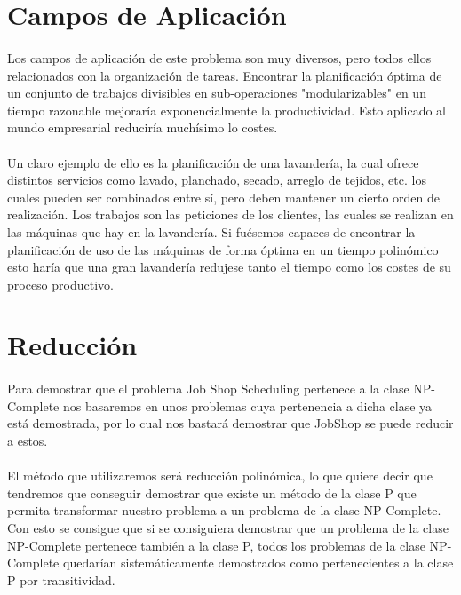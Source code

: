 \documentclass[11pt, a4paper,spanish]{article}
\begin{document}
		\section{Campos de Aplicación}
		
			\paragraph{}
			Los campos de aplicación de este problema son muy diversos, pero todos ellos relacionados con la organización de tareas. Encontrar la planificación óptima de un conjunto de trabajos divisibles en sub-operaciones "modularizables" en un tiempo razonable mejoraría exponencialmente la productividad. Esto aplicado al mundo empresarial reduciría muchísimo lo costes.
		
			\paragraph{}
			Un claro ejemplo de ello es la planificación de una lavandería, la cual ofrece distintos servicios como lavado, planchado, secado, arreglo de tejidos, etc. los cuales pueden ser combinados entre sí, pero deben mantener un cierto orden de realización. Los trabajos son las peticiones de los clientes, las cuales se realizan en las máquinas que hay en la lavandería. Si fuésemos capaces de encontrar la planificación de uso de las máquinas de forma óptima en un tiempo polinómico esto haría que una gran lavandería redujese tanto el tiempo como los costes de su proceso productivo.
				
		\section{Reducción}
		
			\paragraph{}
			Para demostrar que el problema Job Shop Scheduling pertenece a la clase NP-Complete nos basaremos en unos problemas cuya pertenencia a dicha clase ya está demostrada, por lo cual nos bastará demostrar que JobShop se puede reducir a estos. 
			
			\paragraph{}
			El método que utilizaremos será reducción polinómica, lo que quiere decir que tendremos que conseguir demostrar que existe un método de la clase P que permita transformar nuestro problema a un problema de la clase NP-Complete. Con esto se consigue que si se consiguiera demostrar que un problema de la clase NP-Complete pertenece también a la clase P, todos los problemas de la clase NP-Complete quedarían sistemáticamente demostrados como pertenecientes a la clase P por transitividad.
\end{document}
